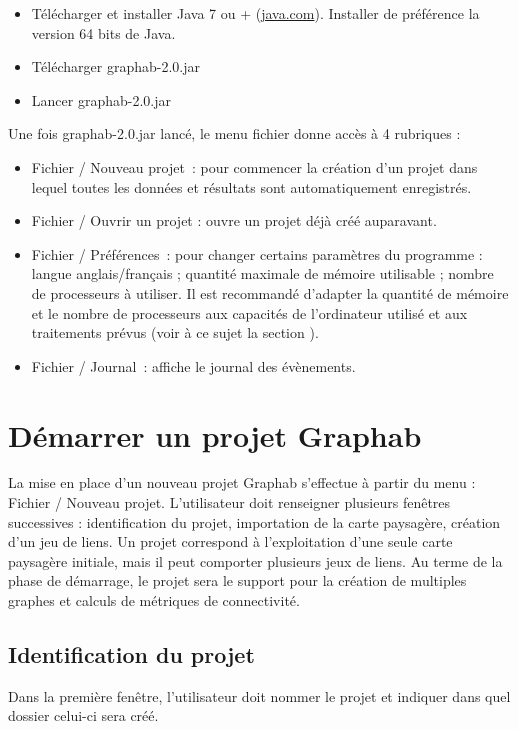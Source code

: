 \documentclass{article}
\begin{document}
\begin{itemize}
	\item Télécharger et installer Java 7 ou + (\href{http://www.java.com}{java.com}). Installer de préférence la version 64 bits de Java.
	\item Télécharger graphab-2.0.jar
	\item Lancer graphab-2.0.jar
\end{itemize}

Une fois graphab-2.0.jar lancé, le menu fichier donne accès à 4 rubriques : 
\begin{itemize}
	\item Fichier / Nouveau projet~: pour commencer la création d’un projet dans lequel toutes les données et résultats sont automatiquement enregistrés.
	\item Fichier / Ouvrir un projet : ouvre un projet déjà créé auparavant.
	\item Fichier / Préférences~: pour changer certains paramètres du programme : langue anglais/français ; quantité maximale de mémoire utilisable ; nombre de processeurs à utiliser. Il est recommandé d’adapter la quantité de mémoire et le nombre de processeurs aux capacités de l’ordinateur utilisé et aux traitements prévus (voir à ce sujet la section ).  
	\item Fichier / Journal~: affiche le journal des évènements.
\end{itemize}

\section{Démarrer un projet Graphab}

La mise en place d’un nouveau projet Graphab s’effectue à partir du menu : Fichier / Nouveau projet. L’utilisateur doit renseigner plusieurs fenêtres successives : identification du projet, importation de la carte paysagère, création d’un jeu de liens. Un projet correspond à l’exploitation d’une seule carte paysagère initiale, mais il peut comporter plusieurs jeux de liens. Au terme de la phase de démarrage, le projet sera le support pour la création de multiples graphes et calculs de métriques de connectivité.

\subsection{Identification du projet}

Dans la première fenêtre, l’utilisateur doit nommer le projet et indiquer dans quel dossier celui-ci sera créé.
\end{document}
